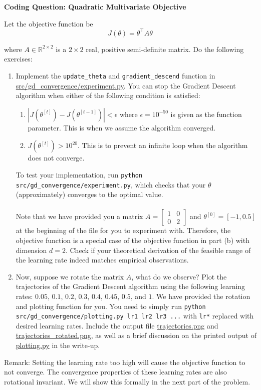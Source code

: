\newpage

\item {} {\bf Coding Question: Quadratic Multivariate Objective}

Let the objective function be 
\begin{equation*}
	J(\theta) = \theta^\top A\theta
\end{equation*}

where $A\in\mathbb{R}^{2\times 2}$ is a $2 \times 2$ real, positive semi-definite matrix. Do the following exercises:

\begin{enumerate}
	\item Implement the \texttt{update\_theta} and \texttt{gradient\_descend} function in \url{src/gd_convergence/experiment.py}. You can stop the Gradient Descent algorithm when either of the following condition is satisfied:
	\begin{enumerate}
		\item $|J(\theta^{[t]}) - J(\theta^{[t-1]})| < \epsilon$ where $\epsilon=10^{-50}$ is given as the function parameter. This is when we assume the algorithm converged. 
		\item $J(\theta^{[t]}) > 10^{20}$. This is to prevent an infinite loop when the algorithm does not converge.
	\end{enumerate}
	To test your implementation, run \texttt{python src/gd\_convergence/experiment.py}, which checks that your $\theta$ (approximately) converges to the optimal value. \\
	\\
	Note that we have provided you a matrix $A=\begin{bmatrix} 1 & 0 \\ 0 & 2 \end{bmatrix}$ and $\theta^{[0]} = [-1, 0.5]$ at the beginning of the file for you to experiment with. Therefore, the objective function is a special case of the objective function in part (b) with dimension $d=2$. Check if your theoretical derivation of the feasible range of the learning rate indeed matches empirical observations. 
	\item Now, suppose we rotate the matrix $A$, what do we observe?
	 Plot the trajectories of the Gradient Descent algorithm using the following learning rates: $0.05$, $0.1$, $0.2$, $0.3$, $0.4$, $0.45$, $0.5$, and $1$. We have provided the rotation and plotting function for you. You need to simply run \texttt{python src/gd\_convergence/plotting.py lr1 lr2 lr3 ...} with \texttt{lr*} replaced with desired learning rates. Include the output file \url{trajectories.png} and \url{trajectories_rotated.png}, as well as a brief discussion on the printed output of \url{plotting.py} in the write-up.
\end{enumerate}

Remark: Setting the learning rate too high will cause the objective function to not converge. The convergence properties of these learning rates are also rotational invariant. We will show this formally in the next part of the problem.